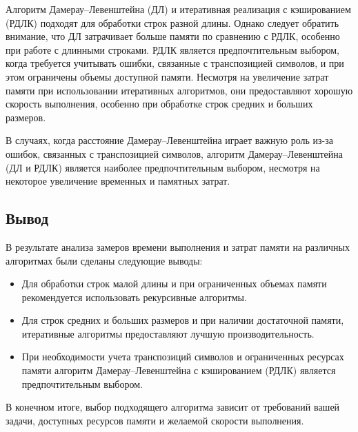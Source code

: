 	Алгоритм Дамерау--Левенштейна (ДЛ) и итеративная реализация с кэшированием (РДЛК) подходят для обработки строк разной длины. 
	Однако следует обратить внимание, что ДЛ затрачивает больше памяти по сравнению с РДЛК, особенно при работе с длинными строками. 
	РДЛК является предпочтительным выбором, когда требуется учитывать ошибки, связанные с транспозицией символов, и при этом ограничены объемы доступной памяти.
	Несмотря на увеличение затрат памяти при использовании итеративных алгоритмов, они предоставляют хорошую скорость выполнения, особенно при обработке строк средних и больших размеров.
	
	В случаях, когда расстояние Дамерау--Левенштейна играет важную роль из-за ошибок, связанных с транспозицией символов, алгоритм Дамерау--Левенштейна (ДЛ и РДЛК) является наиболее предпочтительным выбором, несмотря на некоторое увеличение временных и памятных затрат.

\subsection{Вывод}

В результате анализа замеров времени выполнения и затрат памяти на различных алгоритмах были сделаны следующие выводы:

\begin{itemize}
	\item Для обработки строк малой длины и при ограниченных объемах памяти рекомендуется использовать рекурсивные алгоритмы.
	\item Для строк средних и больших размеров и при наличии достаточной памяти, итеративные алгоритмы предоставляют лучшую производительность.
	\item При необходимости учета транспозиций символов и ограниченных ресурсах памяти алгоритм Дамерау--Левенштейна с кэшированием (РДЛК) является предпочтительным выбором.
\end{itemize}

В конечном итоге, выбор подходящего алгоритма зависит от требований вашей задачи, доступных ресурсов памяти и желаемой скорости выполнения.
